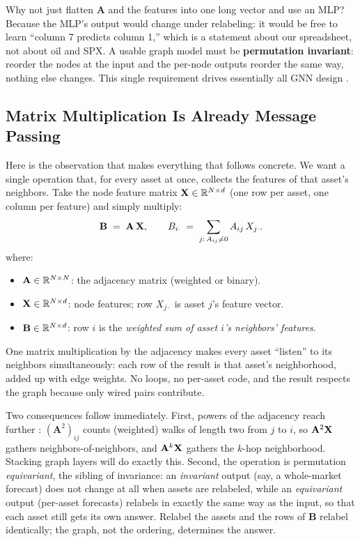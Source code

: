 Why not just flatten $\mathbf{A}$ and the features into one long vector and use an MLP? Because the MLP's output would change under relabeling: it would be free to learn ``column 7 predicts column 1,'' which is a statement about our spreadsheet, not about oil and SPX. A usable graph model must be \textbf{permutation invariant}: reorder the nodes at the input and the per-node outputs reorder the same way, nothing else changes. This single requirement drives essentially all GNN design \citep{SanchezLengeling2021, Battaglia2018}.

\subsection{Matrix Multiplication Is Already Message Passing}\label{sec:gnn:matmul}

Here is the observation that makes everything that follows concrete. We want a single operation that, for every asset at once, collects the features of that asset's neighbors. Take the node feature matrix $\mathbf{X} \in \mathbb{R}^{N \times d}$ (one row per asset, one column per feature) and simply multiply:
\begin{equation}\label{eq:gnn:ax}
  \mathbf{B} \;=\; \mathbf{A}\,\mathbf{X},
  \qquad
  B_{i\cdot} \;=\; \sum_{j:\,A_{ij}\neq 0} A_{ij}\, X_{j\cdot}.
\end{equation}
where:
\begin{itemize}[nosep]
  \item $\mathbf{A} \in \mathbb{R}^{N \times N}$: the adjacency matrix (weighted or binary).
  \item $\mathbf{X} \in \mathbb{R}^{N \times d}$: node features; row $X_{j\cdot}$ is asset $j$'s feature vector.
  \item $\mathbf{B} \in \mathbb{R}^{N \times d}$: row $i$ is the \emph{weighted sum of asset $i$'s neighbors' features}.
\end{itemize}

\begin{intuition}
One matrix multiplication by the adjacency makes every asset ``listen'' to its neighbors simultaneously: each row of the result is that asset's neighborhood, added up with edge weights. No loops, no per-asset code, and the result respects the graph because only wired pairs contribute.
\end{intuition}

Two consequences follow immediately. First, powers of the adjacency reach further \citep{SanchezLengeling2021}: $(\mathbf{A}^2)_{ij}$ counts (weighted) walks of length two from $j$ to $i$, so $\mathbf{A}^2\mathbf{X}$ gathers neighbors-of-neighbors, and $\mathbf{A}^k\mathbf{X}$ gathers the $k$-hop neighborhood. Stacking graph layers will do exactly this. Second, the operation is permutation \emph{equivariant}, the sibling of invariance: an \emph{invariant} output (say, a whole-market forecast) does not change at all when assets are relabeled, while an \emph{equivariant} output (per-asset forecasts) relabels in exactly the same way as the input, so that each asset still gets its own answer. Relabel the assets and the rows of $\mathbf{B}$ relabel identically; the graph, not the ordering, determines the answer.

